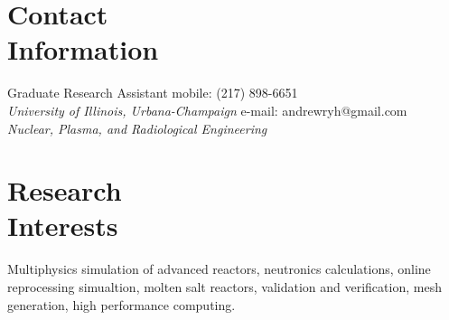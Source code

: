 \documentclass[margin,line]{resume}
\begin{document}
\begin{resume}

    \section{\mysidestyle Contact\\Information}
    Graduate Research Assistant \hfill mobile: (217) 898-6651 \vspace{0mm}\\\vspace{0mm}%
        \textsl{University of Illinois, Urbana-Champaign}
        \hfill e-mail: andrewryh@gmail.com            \vspace{0mm}\\\vspace{0mm}%
    \textsl{Nuclear, Plasma, and Radiological Engineering}
       
    \section{\mysidestyle Research\\Interests}
		Multiphysics simulation of advanced reactors, neutronics calculations, online reprocessing simualtion,
		molten salt reactors, validation and verification, mesh generation, high performance computing.

\end{resume}
\end{document}
